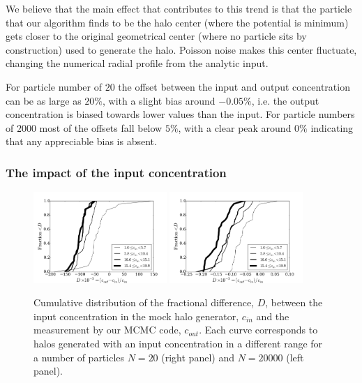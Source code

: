 \documentclass{emulateapj}
\begin{document}
We believe that the main effect that contributes to this trend
is that the particle that our algorithm finds to be the halo center
(where the potential is minimum) gets closer to the original
geometrical center (where no particle sits by construction) used to
generate the halo.  Poisson noise makes this center fluctuate,
changing the numerical radial profile from the analytic input.

For particle number of $20$ the offset between the input and output
concentration can be as large as $20\%$, with a slight bias around
$-0.05\%$, i.e. the output concentration is biased towards lower
values than the input.
For particle numbers of $2000$ most of the offsets fall below $5\%$,
with a clear peak around $0\%$ indicating that any appreciable bias is
absent.


\subsubsection{The impact of the input concentration}

\begin{figure}
  \includegraphics[width=0.45\textwidth]{mock_percentual_diff_conc_20.pdf}
  \includegraphics[width=0.45\textwidth]{mock_percentual_diff_conc_20000.pdf}
\caption{Cumulative distribution of the fractional difference, $D$, between
  the input concentration in the mock halo generator, $c_{in}$ and the
  measurement by our MCMC code, $c_{out}$. Each curve corresponds to
  halos generated with an input concentration in a different range for
  a number of particles $N=20$ (right panel) and $N=20000$ (left panel).
    \label{fig:results_mocks_conc}}
\end{figure}
\end{document}
